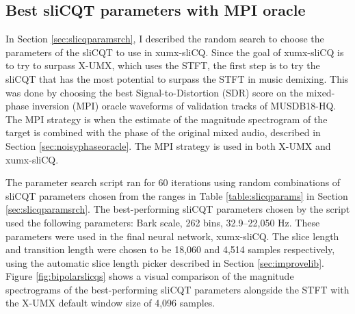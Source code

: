 \documentclass[report.tex]{subfiles}
\begin{document}
\subsection{Best sliCQT parameters with MPI oracle}
\label{sec:slicqparamresults}

In Section \ref{sec:slicqparamsrch}, I described the random search to choose the parameters of the sliCQT to use in xumx-sliCQ. Since the goal of xumx-sliCQ is to try to surpass X-UMX, which uses the STFT, the first step is to try the sliCQT that has the most potential to surpass the STFT in music demixing. This was done by choosing the best Signal-to-Distortion (SDR) score on the mixed-phase inversion (MPI) oracle waveforms of validation tracks of MUSDB18-HQ. The MPI strategy is when the estimate of the magnitude spectrogram of the target is combined with the phase of the original mixed audio, described in Section \ref{sec:noisyphaseoracle}. The MPI strategy is used in both X-UMX and xumx-sliCQ.

The parameter search script ran for 60 iterations using random combinations of sliCQT parameters chosen from the ranges in Table \ref{table:slicqparams} in Section \ref{sec:slicqparamsrch}. The best-performing sliCQT parameters chosen by the script used the following parameters: Bark scale, 262 bins, 32.9--22,050 Hz. These parameters were used in the final neural network, xumx-sliCQ. The slice length and transition length were chosen to be 18,060 and 4,514 samples respectively, using the automatic slice length picker described in Section \ref{sec:improvelib}. Figure \ref{fig:bipolarslicqs} shows a visual comparison of the magnitude spectrograms of the best-performing sliCQT parameters alongside the STFT with the X-UMX default window size of 4,096 samples.
\end{document}
